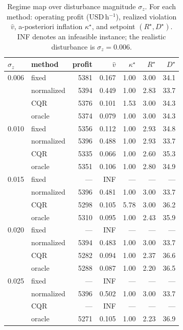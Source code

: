 \documentclass[journal]{IEEEtran}
\begin{document}
\begin{table}[t]
\centering
\caption{Regime map over disturbance magnitude $\sigma_z$. For each method: operating profit
(USD\,h$^{-1}$), realized violation $\hat v$, a-posteriori inflation $\kappa^\star$, and setpoint
$(R^\star,D^\star)$. INF denotes an infeasible instance; the realistic disturbance is
$\sigma_z=0.006$.}
\label{tab:regime}
\begin{tabular}{@{}llrrrrr@{}}
\toprule
$\sigma_z$ & method & profit & $\hat v$ & $\kappa^\star$ & $R^\star$ & $D^\star$ \\
\midrule
0.006 & fixed       & 5381 & 0.167 & 1.00 & 3.00 & 34.1 \\
      & normalized  & 5394 & 0.449 & 1.00 & 2.83 & 33.7 \\
      & CQR         & 5376 & 0.101 & 1.53 & 3.00 & 34.3 \\
      & oracle      & 5374 & 0.079 & 1.00 & 3.00 & 34.3 \\
\midrule
0.010 & fixed       & 5356 & 0.112 & 1.00 & 2.93 & 34.8 \\
      & normalized  & 5396 & 0.488 & 1.00 & 2.93 & 33.7 \\
      & CQR         & 5335 & 0.066 & 1.00 & 2.60 & 35.3 \\
      & oracle      & 5351 & 0.106 & 1.00 & 2.80 & 34.9 \\
\midrule
0.015 & fixed       & ---  & INF   & ---  & ---  & ---  \\
      & normalized  & 5396 & 0.481 & 1.00 & 3.00 & 33.7 \\
      & CQR         & 5298 & 0.105 & 5.78 & 3.00 & 36.2 \\
      & oracle      & 5310 & 0.095 & 1.00 & 2.43 & 35.9 \\
\midrule
0.020 & fixed       & ---  & INF   & ---  & ---  & ---  \\
      & normalized  & 5394 & 0.483 & 1.00 & 3.00 & 33.7 \\
      & CQR         & 5282 & 0.094 & 1.00 & 2.37 & 36.6 \\
      & oracle      & 5288 & 0.087 & 1.00 & 2.20 & 36.5 \\
\midrule
0.025 & fixed       & ---  & INF   & ---  & ---  & ---  \\
      & normalized  & 5396 & 0.502 & 1.00 & 3.00 & 33.7 \\
      & CQR         & ---  & INF   & ---  & ---  & ---  \\
      & oracle      & 5271 & 0.105 & 1.00 & 2.23 & 36.9 \\
\bottomrule
\end{tabular}
\end{table}
\end{document}

